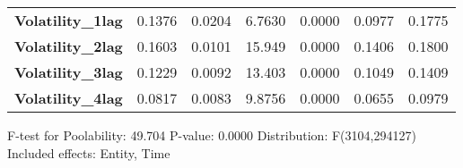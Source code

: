 \begin{center}
\begin{tabular}{lcccccc}
\textbf{Volatility\_1lag}               &       0.1376       &       0.0204       &      6.7630     &      0.0000      &       0.0977      &       0.1775       \\
\textbf{Volatility\_2lag}               &       0.1603       &       0.0101       &      15.949     &      0.0000      &       0.1406      &       0.1800       \\
\textbf{Volatility\_3lag}               &       0.1229       &       0.0092       &      13.403     &      0.0000      &       0.1049      &       0.1409       \\
\textbf{Volatility\_4lag}               &       0.0817       &       0.0083       &      9.8756     &      0.0000      &       0.0655      &       0.0979       \\
\bottomrule
\end{tabular}
\end{center}

F-test for Poolability: 49.704 \newline
 P-value: 0.0000 \newline
 Distribution: F(3104,294127) \newline
  \newline
 Included effects: Entity, Time